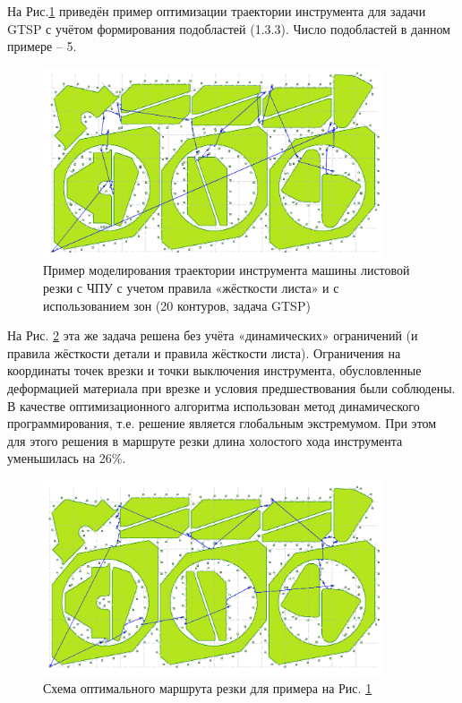 \documentclass[12pt]{report}
\begin{document}
На Рис.\ref{zones-a}
приведён пример оптимизации траектории
инструмента для задачи GTSP с учётом
формирования подобластей  (1.3.3).
Число подобластей в данном примере – 5.

\begin{figure}
  \begin{center}
  \includegraphics[width=0.9\textwidth]{zones-a.png}
  \caption{Пример моделирования траектории инструмента машины листовой резки с ЧПУ
    с учетом правила «жёсткости листа» и с использованием зон (20 контуров, задача GTSP)}
  \label{zones-a}
  \end{center}
\end{figure}

На Рис. \ref{zones-b}
эта же задача решена без учёта
«динамических» ограничений
(и правила жёсткости детали и правила жёсткости листа).
Ограничения на координаты точек врезки и
точки выключения инструмента,
обусловленные деформацией материала при врезке и
условия предшествования были соблюдены.
В качестве оптимизационного алгоритма
использован метод динамического программирования,
т.е. решение является глобальным экстремумом.
При этом для этого решения в маршруте резки
длина холостого хода инструмента уменьшилась на 26\%.

\begin{figure}
  \begin{center}
  \includegraphics[width=0.9\textwidth]{zones-b.png}
  \caption{Схема оптимального маршрута резки для примера на Рис. \ref{zones-a}}
  \label{zones-b}
  \end{center}
\end{figure}
\end{document}
